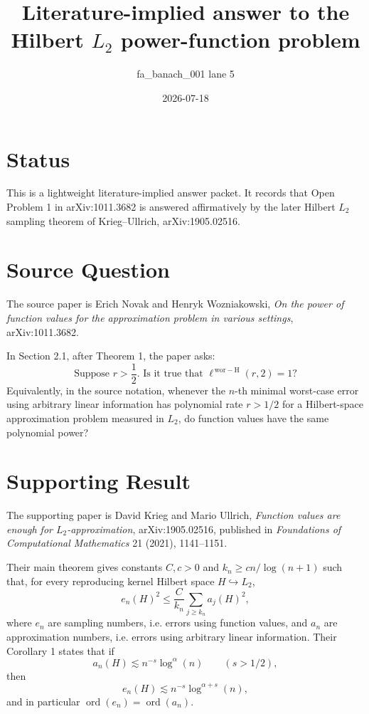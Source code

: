 \documentclass[11pt]{amsart}
\title{Literature-implied answer to the Hilbert \(L_2\) power-function problem}
\author{fa\_banach\_001 lane 5}
\date{2026-07-18}
\DeclareMathOperator{\ord}{ord}
\newcommand{\ellworH}{\ell^{\,\mathrm{wor-H}}}
\begin{document}
\maketitle

\section*{Status}

This is a lightweight literature-implied answer packet.  It records that
Open Problem 1 in arXiv:1011.3682 is answered affirmatively by the later
Hilbert \(L_2\) sampling theorem of Krieg--Ullrich, arXiv:1905.02516.

\section*{Source Question}

The source paper is Erich Novak and Henryk Wozniakowski, \emph{On the power
of function values for the approximation problem in various settings},
arXiv:1011.3682.

In Section 2.1, after Theorem 1, the paper asks:
\[
  \text{Suppose } r>\frac12. \text{ Is it true that }
  \ellworH(r,2)=1?
\]
Equivalently, in the source notation, whenever the \(n\)-th minimal worst-case
error using arbitrary linear information has polynomial rate \(r>1/2\) for a
Hilbert-space approximation problem measured in \(L_2\), do function values
have the same polynomial power?

\section*{Supporting Result}

The supporting paper is David Krieg and Mario Ullrich, \emph{Function values
are enough for \(L_2\)-approximation}, arXiv:1905.02516, published in
\emph{Foundations of Computational Mathematics} 21 (2021), 1141--1151.

Their main theorem gives constants \(C,c>0\) and \(k_n\ge c n/\log(n+1)\)
such that, for every reproducing kernel Hilbert space \(H\hookrightarrow L_2\),
\[
  e_n(H)^2 \le \frac{C}{k_n}\sum_{j\ge k_n} a_j(H)^2,
\]
where \(e_n\) are sampling numbers, i.e. errors using function values, and
\(a_n\) are approximation numbers, i.e. errors using arbitrary linear
information.  Their Corollary 1 states that if
\[
  a_n(H)\lesssim n^{-s}\log^\alpha(n)
  \qquad (s>1/2),
\]
then
\[
  e_n(H)\lesssim n^{-s}\log^{\alpha+s}(n),
\]
and in particular \(\ord(e_n)=\ord(a_n)\).
\end{document}
